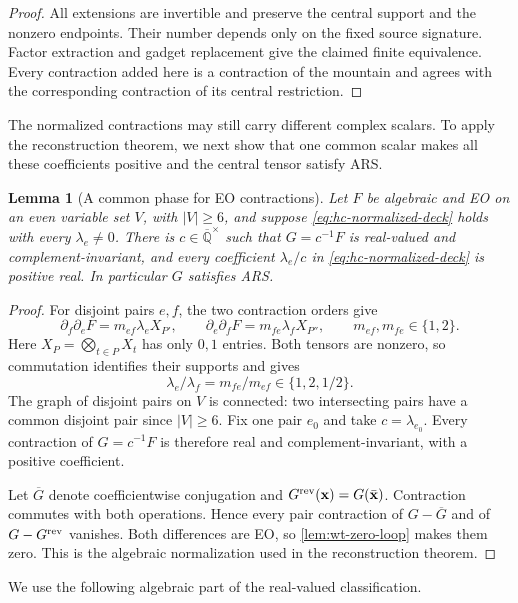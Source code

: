 \documentclass[11pt,letterpaper,onecolumn]{article}
\theoremstyle{plain}
\newtheorem{lemma}[lemma]{Lemma}
\theoremstyle{definition}
\theoremstyle{remark}
\newcommand{\AlgNums}{\overline{\mathbb Q}}
\begin{document}
\begin{proof}
		All extensions are invertible and preserve the central support and the
		nonzero endpoints.  Their number depends only on the fixed source
		signature.  Factor extraction and gadget replacement give the
		claimed finite equivalence.  Every contraction added here is a contraction of the mountain
		and agrees with the corresponding contraction of its central restriction.
	\end{proof}
	
	The normalized contractions may still carry different complex scalars.
	To apply the reconstruction theorem, we next show that one common scalar
	makes all these coefficients positive and the central tensor satisfy ARS.
	\begin{lemma}[A common phase for EO contractions]
		\label{lem:hc-global-phase}
		Let \(F\) be algebraic and EO on an even variable set \(V\), with \(|V|\ge6\), and suppose
		\eqref{eq:hc-normalized-deck} holds with every \(\lambda_e\ne0\).
		There is \(c\in\AlgNums^\times\) such that \(G=c^{-1}F\) is real-valued
		and complement-invariant, and every coefficient
		\(\lambda_e/c\) in \eqref{eq:hc-normalized-deck} is positive real.
		In particular \(G\) satisfies ARS.
	\end{lemma}
	
	\begin{proof}
		For disjoint pairs \(e,f\), the two contraction orders give
		\[
		\partial_f\partial_eF=m_{ef}\lambda_e X_{P'},
		\qquad
		\partial_e\partial_fF=m_{fe}\lambda_f X_{P''},
		\qquad m_{ef},m_{fe}\in\{1,2\}.
		\]
		Here \(X_P=\bigotimes_{t\in P}X_t\) has only \(0,1\) entries.
		Both tensors are nonzero, so commutation identifies their supports and
		gives
		\[
		\lambda_e/\lambda_f=m_{fe}/m_{ef}\in\{1,2,1/2\}.
		\]
		The graph of disjoint pairs on \(V\) is connected: two intersecting pairs
		have a common disjoint pair since \(|V|\ge6\).
		Fix one pair \(e_0\) and take \(c=\lambda_{e_0}\).
		Every contraction of \(G=c^{-1}F\) is therefore real and
		complement-invariant, with a positive coefficient.
		
		Let \(\overline G\) denote coefficientwise conjugation and
		\(G^{\rm rev}({\mathbf x})=G(\bar {\mathbf x})\).
		Contraction commutes with both operations.  Hence every pair contraction
		of \(G-\overline G\) and of \(G-G^{\rm rev}\) vanishes.
		Both differences are EO, so \cref{lem:wt-zero-loop} makes them zero.
		This is the algebraic normalization used in the reconstruction theorem.
	\end{proof}
	
	We use the following algebraic part of the real-valued
	classification.
	
\end{document}
